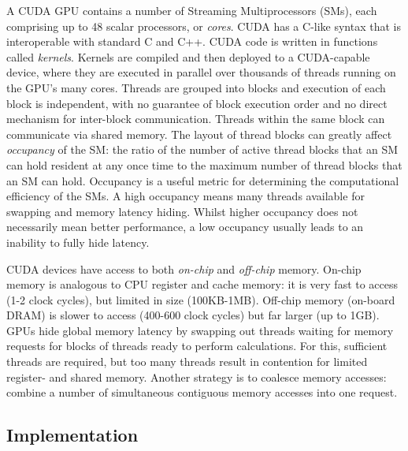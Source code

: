 A CUDA GPU contains a number of Streaming Multiprocessors (SMs), each comprising up to 48 scalar processors, or \emph{cores}.   CUDA has a C-like syntax that is interoperable with standard C and C++. CUDA code is written in functions called \emph{kernels}.  Kernels are compiled and then deployed to a CUDA-capable device, where they are executed in parallel over thousands of threads running on the GPU's many cores.   Threads are grouped into blocks and execution of each block is independent, with no guarantee of block execution order and no direct mechanism for inter-block communication. Threads within the same block can communicate via shared memory.  The layout of thread blocks can greatly affect \emph{occupancy} of the SM: the ratio of the number of active thread blocks that an SM can hold resident at any once time to the maximum number of thread blocks that an SM can hold. Occupancy is a useful metric for determining the computational efficiency of the SMs. A high occupancy means many threads available  for swapping and memory latency hiding. Whilst higher occupancy does not necessarily mean better performance, a low occupancy usually leads to an inability to fully hide latency.

CUDA devices have access to both \emph{on-chip} and \emph{off-chip} memory. On-chip memory is analogous to CPU register and cache memory: it is very fast to access (1-2 clock cycles), but limited in size (100KB-1MB). Off-chip memory (on-board DRAM) is slower to access (400-600 clock cycles) but far larger (up to 1GB). GPUs hide global memory latency by swapping out threads waiting for memory requests for blocks of threads ready to perform calculations. For this, sufficient threads are required, but too many threads result in contention for limited register- and shared memory. Another strategy is to coalesce memory accesses:  combine a number of simultaneous contiguous memory accesses into one request.



\subsection{Implementation} 

\label{sec:shared-memory}
\label{sec:multiple-sources-per}

